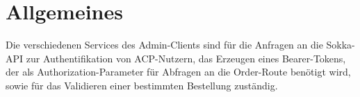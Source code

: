 \section{Allgemeines}

Die verschiedenen Services des Admin-Clients sind für die Anfragen an die Sokka-API zur 
Authentifikation von ACP-Nutzern, das Erzeugen eines Bearer-Tokens, der als Authorization-Parameter
für Abfragen an die Order-Route benötigt wird, sowie für das Validieren einer bestimmten
Bestellung zuständig.